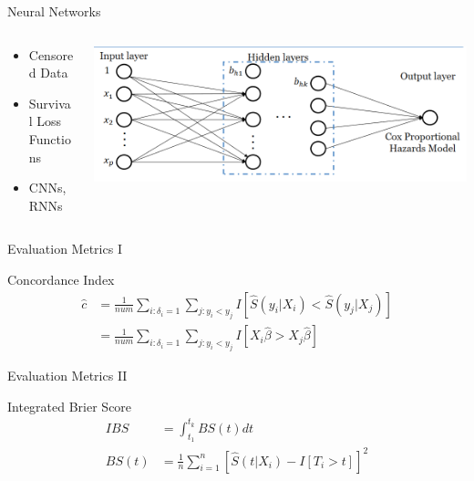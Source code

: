 \documentclass{beamer}
\begin{document}
\begin{frame}{Neural Networks}
\begin{columns}
    \begin{column}{0.49 \textwidth}
    \begin{itemize}
        \item Censored Data
        \item Survival Loss Functions
        \item CNNs, RNNs
    \end{itemize}
        \cite{WangEtAl}
    \end{column}
    \begin{column}{0.49 \textwidth}
        \centering
        \includegraphics[width=\textwidth]{images/nn.png}
    \end{column}
\end{columns}
\end{frame}

\begin{frame}{Evaluation Metrics I}

\begin{block}{Concordance Index}
\begin{align*}
    \hat{c} &= \frac{1}{num} \sum_{i: \delta_i = 1} \sum_{j:y_i<y_j} I[\hat{S}(y_i|X_i) < \hat{S}(y_j|X_j)] \\
    &= \frac{1}{num} \sum_{i: \delta_i = 1}\sum_{j:y_i<y_j}  I[X_i\hat{\beta} > X_j \hat{\beta}]
\end{align*}
\end{block}

\cite{UnoEtAl}

\end{frame}

\begin{frame}{Evaluation Metrics II}
\begin{block}{Integrated Brier Score}
\begin{align*}
    IBS &= \int^{t_k}_{t_1}BS(t)dt\\
    BS(t) &= \frac{1}{n}\sum^n_{i=1}\left[\hat{S}(t|X_i)-I[T_i > t]\right]^2
\end{align*}
\end{block}

\cite{GrafEtAl}
\end{frame}
\end{document}
